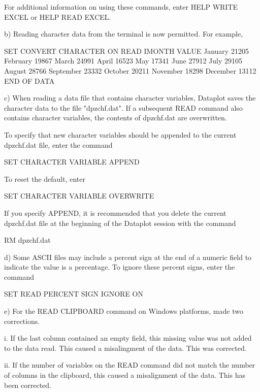        For additional information on using these commands, enter
       HELP WRITE EXCEL or HELP READ EXCEL.

    b) Reading character data from the terminal is now permitted.
       For example,

          SET CONVERT CHARACTER ON
          READ IMONTH VALUE
          January    21205
          February   19867
          March      24991
          April      16523
          May        17341
          June       27912
          July       29105
          August     28766
          September  23332
          October    20211
          November   18298
          December   13112
          END OF DATA

    c) When reading a data file that contains character variables,
       Dataplot saves the character data to the file "dpzchf.dat".
       If a subsequent READ command also contains character variables,
       the contents of dpzchf.dat are overwritten.

       To specify that new character variables should be appended to
       the current dpzchf.dat file, enter the command

           SET CHARACTER VARIABLE APPEND

       To reset the default, enter

           SET CHARACTER VARIABLE OVERWRITE

       If you specify APPEND, it is recommended that you delete the
       current dpzchf.dat file at the beginning of the Dataplot session
       with the command

           RM dpzchf.dat

    d) Some ASCII files may include a percent sign at the end of a
       numeric field to indicate the value is a percentage.  To ignore
       these percent signs, enter the command

           SET READ PERCENT SIGN IGNORE ON

    e) For the READ CLIPBOARD command on Windows platforms, made two
       corrections.

         i. If the last column contained an empty field, this missing
            value was not added to the data read.  This caused a
            misalingment of the data.  This was corrected.

        ii. If the number of variables on the READ command did not
            match the number of columns in the clipboard, this caused a
            misalignment of the data.  This has been corrected.

